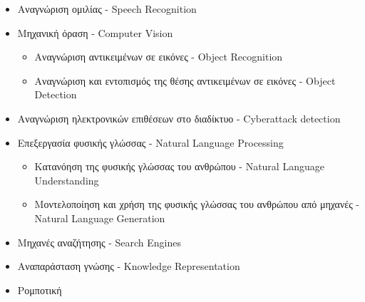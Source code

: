 \begin{itemize}
  \item{Αναγνώριση ομιλίας - Speech Recognition}
  \item{Μηχανική όραση - Computer Vision}
  \begin{itemize}
    \item{Αναγνώριση αντικειμένων σε εικόνες - Object Recognition}
    \item{Αναγνώριση και εντοπισμός της θέσης αντικειμένων σε εικόνες - Object Detection}
  \end{itemize}
  \item{Αναγνώριση ηλεκτρονικών επιθέσεων στο διαδίκτυο - Cyberattack detection}
  \item{Επεξεργασία φυσικής γλώσσας - Natural Language Processing}
  \begin{itemize}
    \item{Κατανόηση της φυσικής γλώσσας του ανθρώπου - Natural Language Understanding}
    \item{Μοντελοποίηση και χρήση της φυσικής γλώσσας του ανθρώπου από μηχανές - Natural Language Generation}
  \end{itemize}
  \item{Μηχανές αναζήτησης - Search Engines}
  \item{Αναπαράσταση γνώσης - Knowledge Representation}
  \item{Ρομποτική}
\end{itemize}

